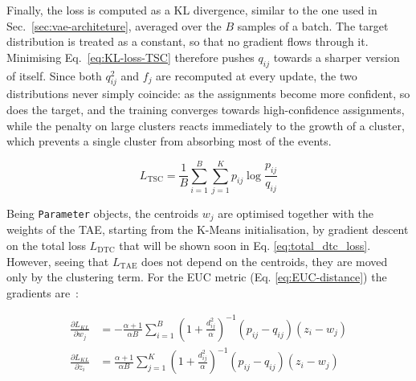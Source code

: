 \begin{itemize}
\end{itemize}


Finally, the loss is computed as a \ac{KL} divergence, similar to the one used in Sec.~\ref{sec:vae-architeture}, averaged over the $B$ samples of a batch. The target distribution is treated as a constant, so that no gradient flows through it. Minimising Eq.~\ref{eq:KL-loss-TSC} therefore pushes $q_{ij}$ towards a sharper version of itself. Since both $q^{2}_{ij}$ and $f_j$ are recomputed at every update, the two distributions never simply coincide: as the assignments become more confident, so does the target, and the training converges towards high-confidence assignments, while the penalty on large clusters reacts immediately to the growth of a cluster, which prevents a single cluster from absorbing most of the events.

\begin{equation}
    \label{eq:KL-loss-TSC}
    L_\text{TSC} = \frac{1}{B} \sum_{i=1}^{B} \sum_{j=1}^{K} p_{ij} \log \frac{p_{ij}}{q_{ij}}
\end{equation}

Being \texttt{Parameter} objects, the centroids $w_j$ are optimised together with the weights of the \ac{TAE}, starting from the K-Means initialisation, by gradient descent on the total loss $L_\text{DTC}$ that will be shown soon in Eq. \ref{eq:total_dtc_loss}. However, seeing that $L_\text{TAE}$ does not depend on the centroids, they are moved only by the clustering term. For the \ac{EUC} metric (Eq. \ref{eq:EUC-distance}) the gradients are~\cite{KL-backpropagation}:


\begin{align}
    \frac{\partial L_{KL}}{\partial w_j} &= -\frac{\alpha + 1}{\alpha B} \sum_{i=1}^{B} \left( 1 + \frac{d_{ij}^2}{\alpha} \right)^{-1} (p_{ij} - q_{ij})(z_i - w_j) \label{eq:grad-centroids} \\
    \frac{\partial L_{KL}}{\partial z_i} &= \frac{\alpha + 1}{\alpha B} \sum_{j=1}^{K} \left( 1 + \frac{d_{ij}^2}{\alpha} \right)^{-1} (p_{ij} - q_{ij})(z_i - w_j) \label{eq:grad-latent}
\end{align}

